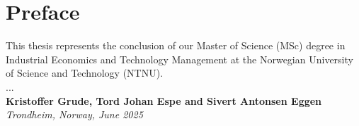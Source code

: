 \section*{\Large Preface}

This thesis represents the conclusion of our Master of Science (MSc) degree in Industrial Economics and Technology Management at the Norwegian University of Science and Technology (NTNU). \\

... \\

\textbf{Kristoffer Grude, Tord Johan Espe and Sivert Antonsen Eggen} \\

\textit{Trondheim, Norway, June 2025}
